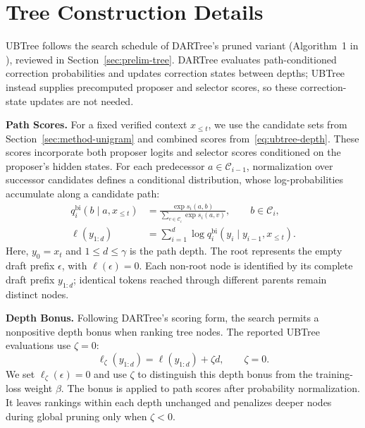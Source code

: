 \section{Tree Construction Details}
\label{app:tree-construction}

UBTree follows the search schedule of DARTree's pruned variant (Algorithm~1 in \citealp{li2026dartree}), reviewed in Section~\ref{sec:prelim-tree}. DARTree evaluates path-conditioned correction probabilities and updates correction states between depths; UBTree instead supplies precomputed proposer and selector scores, so these correction-state updates are not needed.

\noindent\textbf{Path Scores.}
For a fixed verified context $x_{\le t}$, we use the candidate sets from Section~\ref{sec:method-unigram} and combined scores from~\eqref{eq:ubtree-depth}. These scores incorporate both proposer logits and selector scores conditioned on the proposer's hidden states. For each predecessor $a\in\mathcal C_{i-1}$, normalization over successor candidates defines a conditional distribution, whose log-probabilities accumulate along a candidate path:
\begin{equation}
    \begin{aligned}
        q_i^{\mathrm{bi}}(b\mid a,x_{\le t})
        &=\frac{\exp s_i(a,b)}
        {\sum_{v\in\mathcal C_i}\exp s_i(a,v)},
        \qquad b\in\mathcal C_i,\\
        \ell(y_{1:d})
        &=\sum_{i=1}^{d}
        \log q_i^{\mathrm{bi}}(y_i\mid y_{i-1},x_{\le t}).
    \end{aligned}
    \label{eq:ubtree-path}
\end{equation}
Here, $y_0=x_t$ and $1\le d\le\gamma$ is the path depth. The root represents the empty draft prefix $\epsilon$, with $\ell(\epsilon)=0$. Each non-root node is identified by its complete draft prefix $y_{1:d}$; identical tokens reached through different parents remain distinct nodes.

\noindent\textbf{Depth Bonus.}
Following DARTree's scoring form, the search permits a nonpositive depth bonus when ranking tree nodes. The reported UBTree evaluations use $\zeta=0$:
\begin{equation}
    \ell_\zeta(y_{1:d})=\ell(y_{1:d})+\zeta d,
    \qquad \zeta=0.
    \label{eq:ubtree-depth-bonus}
\end{equation}
We set $\ell_\zeta(\epsilon)=0$ and use $\zeta$ to distinguish this depth bonus from the training-loss weight $\beta$. The bonus is applied to path scores after probability normalization. It leaves rankings within each depth unchanged and penalizes deeper nodes during global pruning only when $\zeta<0$.

